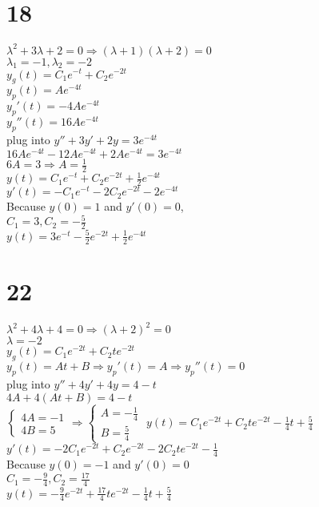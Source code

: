 \documentclass[12pt, a4paper]{IEEEtran}
\begin{document}
\begin{flushleft}
    \section*{18}
    $\lambda^2+3\lambda+2=0\Rightarrow (\lambda+1)(\lambda+2)=0$\\
    $\lambda_1=-1, \lambda_2=-2$\\
    $y_g(t)=C_1e^{-t}+C_2e^{-2t}$\\
    $y_p(t)=Ae^{-4t}$\\
    $y_p'(t)=-4Ae^{-4t}$\\
    $y_p''(t)=16Ae^{-4t}$\\
    plug into $y''+3y'+2y=3e^{-4t}$\\
    $16Ae^{-4t}-12Ae^{-4t}+2Ae^{-4t}=3e^{-4t}$\\
    $6A=3 \Rightarrow A=\frac{1}{2}$\\
    $y(t)=C_1e^{-t}+C_2e^{-2t}+\frac{1}{2}e^{-4t}$\\
    $y'(t)=-C_1e^{-t}-2C_2e^{-2t}-2e^{-4t}$\\
    Because $y(0)=1$ and $y'(0)=0$,\\
    $C_1=3, C_2=-\frac{5}{2}$\\
    $y(t)=3e^{-t}-\frac{5}{2}e^{-2t}+\frac{1}{2}e^{-4t}$\\

    \section*{22}
    $\lambda^2+4\lambda+4=0\Rightarrow(\lambda+2)^2=0$\\
    $\lambda=-2$\\
    $y_g(t)=C_1e^{-2t}+C_2te^{-2t}$\\
    $y_p(t)=At+B\Rightarrow y_p'(t)=A \Rightarrow y_p''(t)=0$\\
    plug into $y''+4y'+4y=4-t$\\
    $4A+4(At+B)=4-t$\\
    \vspace{1ex}
    $\begin{cases}
        4A=-1\\
        4B=5
    \end{cases}
    \Rightarrow
    \begin{cases}
        A=-\frac{1}{4}\\
        B=\frac{5}{4}
    \end{cases}$
    $y(t)=C_1e^{-2t}+C_2te^{-2t}-\frac{1}{4}t+\frac{5}{4}$\\
    $y'(t)=-2C_1e^{-2t}+C_2e^{-2t}-2C_2te^{-2t}-\frac{1}{4}$\\
    Because $y(0)=-1$ and $y'(0)=0$\\
    $C_1=-\frac{9}{4}, C_2=\frac{17}{4}$\\
    $y(t)=-\frac{9}{4}e^{-2t}+\frac{17}{4}te^{-2t}-\frac{1}{4}t+\frac{5}{4}$\\
    

\end{flushleft}
\end{document}
